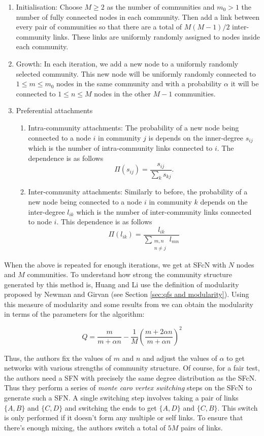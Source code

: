 \begin{enumerate}
    \item Initialisation: Choose $M \geq 2$ as the number of communities and $m_0 > 1$ the number of fully connected nodes in each community. Then add a link between every pair of communities so that there are a total of $M(M-1)/2$ inter-community links. These links are uniformly randomly assigned to nodes inside each community. \\
    \item Growth: In each iteration, we add a new node to a uniformly randomly selected community. This new node will be uniformly randomly connected to $1 \leq m \leq m_0$ nodes in the same community and with a probability $\alpha$ it will be connected to $1 \leq n \leq M$ nodes in the other $M - 1$ communities. \\
    \item Preferential attachments
    \begin{enumerate}
        \item Intra-community attachments: The probability of a new node being connected to a node $i$ in community $j$ is depends on the inner-degree $s_{ij}$ which is the number of intra-community links connected to $i$. The dependence is as follows
            $$ \Pi(s_{ij}) = \frac{s_{ij}}{\sum_ks_{kj}}. $$
        \item Inter-community attachments: Similarly to before, the probability of a new node being connected to a node $i$ in community $k$ depends on the inter-degree $l_{ik}$ which is the number of inter-community links connected to node $i$. This dependence is as follows
            $$ \Pi(l_{ik}) = \frac{l_{ik}}{\sum_{\substack{m, n \\ n \not = j}} l_{mn}} $$
    \end{enumerate}
\end{enumerate}

When the above is repeated for enough iterations, we get at SFcN with $N$ nodes and $M$ communities. To understand how strong the community structure generated by this method is, Huang and Li use the definition of modularity proposed by Newman and Girvan (see Section \ref{sec:qfs and modularity}). Using this measure of modularity and some results from \cite{Li_2005} we can obtain the modularity in terms of the parameters for the algorithm:

$$ Q = \frac{m}{m + \alpha n} - \frac{1}{M}\left(\frac{m + 2\alpha n}{m + \alpha n}\right)^2 $$

Thus, the authors fix the values of $m$ and $n$ and adjust the values of $\alpha$ to get networks with various strengths of community structure. Of course, for a fair test, the authors need a SFN with precisely the same degree distribution as the SFcN. Thus they perform a series of \emph{monte caro vertex switching} steps on the SFcN to generate such a SFN. A single switching step involves taking a pair of links $\{A, B\}$ and $\{C, D\}$ and switching the ends to get $\{A, D\}$ and $\{C, B\}$. This switch is only performed if it doesn't form any multiple or self links. To ensure that there's enough mixing, the authors switch a total of $5M$ pairs of links.
